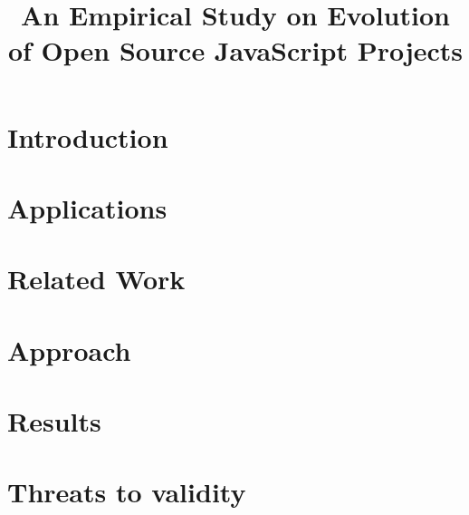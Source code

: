 \documentclass[conference]{IEEEtran}
\begin{document}
\title{An Empirical Study on Evolution of Open Source JavaScript Projects}

\author{
	
	}

\maketitle

\section{Introduction}
\label{sec:introduction}


\section{Applications}
\label{sec:applications}



\section{Related Work}
\label{sec:related_work}


\section{Approach}
\label{sec:approach}

	
\section{Results}
\label{sec:rq}


\section{Threats to validity}
\label{Threats to validity}




\end{document}
